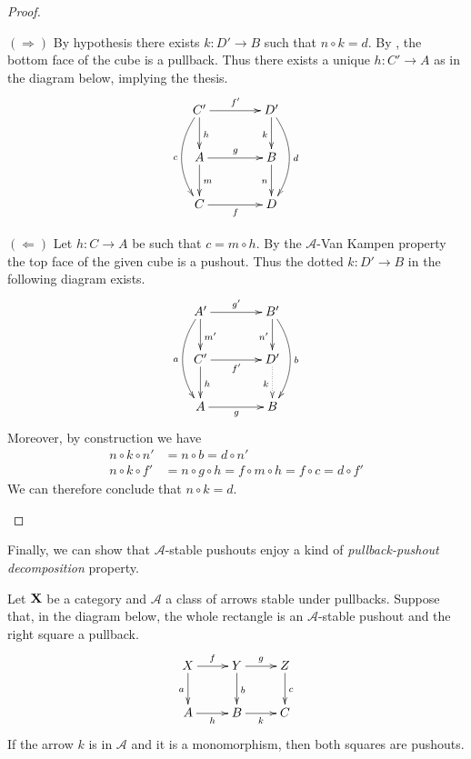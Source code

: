 \documentclass[a4paper,UKenglish,cleveref,pdftex, thm-restate,numberwithinsect]{lipics}
\def\X{\textbf {\textup{X}}}
\begin{document}
\begin{proof}
	\begin{proofEnd}		
		$(\Rightarrow)$ By hypothesis there exists $k:D'\to B$ such that $n\circ k = d$. By , the bottom face of the cube is a pullback. Thus there exists a unique $h:C'\to A$ as in the diagram below, implying the thesis.
		\[\xymatrix@C=40pt{C'  \ar[d]^{h}\ar[r]^{f'} \ar@/_.5cm/[dd]_{c}& D' \ar@/^.5cm/[dd]^{d}\ar[d]_{k}\\ A \ar[d]^{m} \ar[r]^{g} & B \ar[d]_{n} \\  C \ar[r]_f & D}\]
		
		\smallskip \noindent 
		$(\Leftarrow)$ Let $h:C\to A$ be such that $c=m\circ h$. By the $\mathcal{A}$-Van Kampen property the top face of the given cube is a pushout. Thus the dotted $k:D'\to B$ in the following diagram exists.
		\[\xymatrix@C=40pt{A' \ar@/_.5cm/[dd]_{a} \ar[d]^{m'} \ar[r]^{g'} & B' \ar[d]_{n'} \ar@/^.5cm/[dd]^{b} \\  C' \ar[d]^{h} \ar[r]_{f'} & D' \ar@{.>}[d]_{k}\\ A \ar[r]_g& B }\]
		Moreover, by construction we have
		\begin{align*}
	n\circ k \circ n'&= n\circ b=d\circ n'\\
		n\circ k \circ f' &= n\circ g\circ h=f\circ m\circ h=f\circ c= d\circ f' 
		\end{align*}
		We can therefore conclude that $n\circ k =d$.
	\end{proofEnd} \qedhere 
\end{proof}

Finally, we can show that $\mathcal{A}$-stable pushouts enjoy a kind of \emph{pullback-pushout decomposition} property.

\begin{proposition}\label{prop:stab}Let $\X$ be a category and $\mathcal{A}$ a class of arrows stable under pullbacks. Suppose that, in the diagram below, the whole rectangle is an $\mathcal{A}$-stable pushout and the right square a pullback.
	\[\xymatrix{X \ar[d]_{a} \ar[r]^{f}& \ar[r]^{g} Y \ar[d]^{b}& Z \ar[d]^{c}\\ A \ar[r]_{h}& B \ar[r]_{k}& C}\]
	If the arrow $k$ is in $\mathcal{A}$ and it is a monomorphism,  then both squares are pushouts.
\end{proposition}
\end{document}
